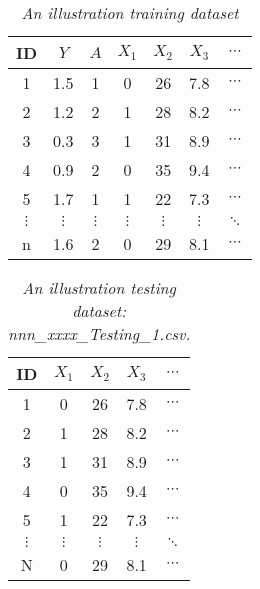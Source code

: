 \documentclass[12pt]{article}
\begin{document}
\begin{table}[htbp]
  \centering
  \caption{\emph{An illustration training dataset}}
    \begin{tabular}{c|c|c|cccc}
    \hline
    \hline
    ID & $Y$     & $A$   & $X_1$    & $X_2$    & $X_3$    & $\cdots$ \\
    \hline
    1&1.5  & 1     & 0     & 26    & 7.8   & $\cdots$ \\
    2&1.2  & 2     & 1     & 28    & 8.2   & $\cdots$  \\
    3&0.3  & 3     & 1     & 31    & 8.9   & $\cdots$  \\
    4&0.9  & 2     & 0     & 35    & 9.4   & $\cdots$  \\
    5&1.7  & 1     & 1     & 22    & 7.3   & $\cdots$  \\
    $\vdots$ & $\vdots$    & $\vdots$    & $\vdots$   & $\vdots$     & $\vdots$     & $\ddots$  \\
    n & 1.6 & 2 & 0 & 29 & 8.1 & $\cdots$ \\
    \hline
    \hline
    \end{tabular}%
  \label{tab:TrainingDataExample}%
\end{table}%

\begin{table}[htbp]
  \centering
  \caption{\emph{An illustration testing dataset: nnn\_xxxx\_Testing\_1.csv.} }
    \begin{tabular}{c|cccc}
    \hline
    \hline
    ID &  $X_1$    & $X_2$    & $X_3$    & $\cdots$ \\
    \hline
    1& 0     & 26    & 7.8   & $\cdots$ \\
    2& 1     & 28    & 8.2   & $\cdots$  \\
    3& 1     & 31    & 8.9   & $\cdots$  \\
    4& 0     & 35    & 9.4   & $\cdots$  \\
    5& 1     & 22    & 7.3   & $\cdots$  \\
    $\vdots$ &  $\vdots$   & $\vdots$     & $\vdots$     & $\ddots$  \\
    N &  0 & 29 & 8.1 & $\cdots$ \\
    \hline
    \hline
    \end{tabular}%
  \label{tab:TestingDataExample1}%
\end{table}
\end{document}
